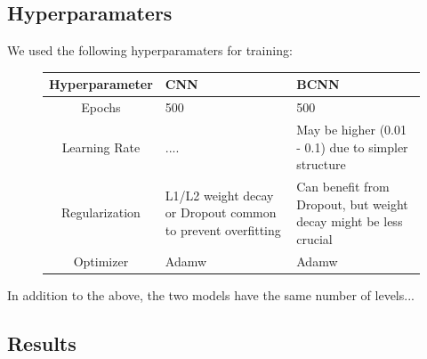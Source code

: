 \documentclass[12pt]{article}
\begin{document}
\subsection{Hyperparamaters}

We used the following hyperparamaters for training:
\begin{figure}[H]
	\begin{center}
	\begin{tabular}{|c||p{3cm}|p{3cm}|} %
		\hline
		\textbf{Hyperparameter} & \textbf{CNN} & \textbf{BCNN} \\ [0.5ex] 
		\hline\hline
		Epochs & 500 & 500\\
		\hline
		Learning Rate & ....  & May be higher (0.01 - 0.1) due to simpler structure  \\
		\hline
		Regularization & L1/L2 weight decay or Dropout common to prevent overfitting & Can benefit from Dropout, but weight decay might be less crucial \\
		\hline
		Optimizer & Adamw  & Adamw  \\
		\hline
	\end{tabular}
\end{center}
\end{figure}


In addition to the above, the two models have the same number of levels...

\subsection{Results}
\end{document}
